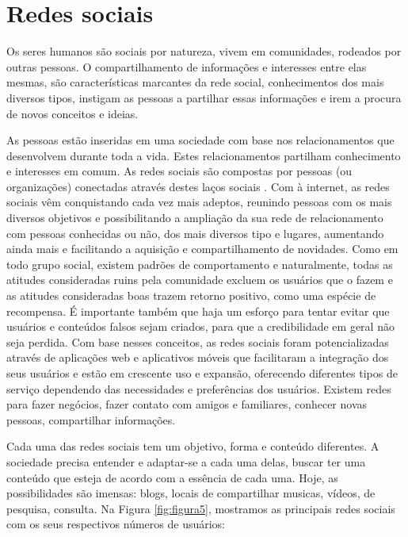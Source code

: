 \section{Redes sociais}

Os seres humanos são sociais por natureza, vivem em comunidades, rodeados por outras pessoas. O compartilhamento de informações e interesses entre elas mesmas, são características marcantes da rede social, conhecimentos dos mais diversos tipos, instigam as pessoas a partilhar essas informações e irem a procura de novos conceitos e ideias.

As pessoas estão inseridas em uma sociedade com base nos relacionamentos que desenvolvem durante toda a vida. Estes relacionamentos partilham conhecimento e interesses em comum. As redes sociais são compostas por pessoas (ou organizações) conectadas através destes laços sociais \citeauthor{watts2003}. Com à internet, as redes sociais vêm conquistando cada vez mais adeptos, reunindo pessoas com os mais diversos objetivos e possibilitando a ampliação da sua rede de  relacionamento com pessoas conhecidas ou não, dos mais diversos tipo e lugares, aumentando ainda mais e facilitando a aquisição e compartilhamento de novidades. Como em todo grupo social, existem padrões de comportamento e naturalmente, todas as atitudes consideradas ruins pela comunidade excluem os usuários que o fazem e as atitudes consideradas boas trazem retorno positivo, como uma espécie de recompensa. É importante também que haja um esforço para tentar evitar que usuários e conteúdos falsos sejam criados, para que a credibilidade em geral não seja perdida. Com base nesses conceitos, as redes sociais foram potencializadas através de aplicações web e aplicativos móveis que facilitaram a integração dos seus usuários e estão em crescente uso e expansão, oferecendo diferentes tipos de serviço dependendo das necessidades e preferências dos usuários. Existem redes para fazer negócios, fazer contato com amigos e familiares, conhecer novas pessoas, compartilhar informações. 

Cada uma das redes sociais tem um objetivo, forma e conteúdo diferentes. A sociedade precisa entender e adaptar-se a cada uma delas, buscar ter uma conteúdo que esteja de acordo com a essência de cada uma. Hoje,  as possibilidades são imensas: blogs, locais  de compartilhar musicas, vídeos, de pesquisa, consulta. Na Figura \ref{fig:figura5}, mostramos as principais redes sociais com os seus respectivos números de usuários: 


